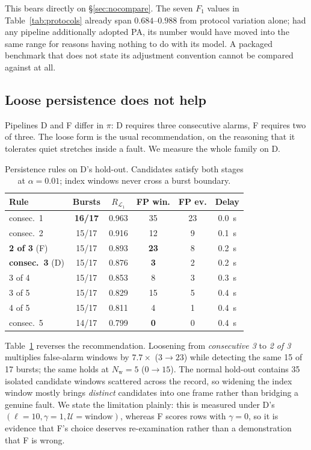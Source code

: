 \documentclass{article}
\begin{document}
This bears directly on \S\ref{sec:nocompare}. The seven $F_1$ values in
Table~\ref{tab:protocols} already span $0.684$--$0.988$ from protocol variation
alone; had any pipeline additionally adopted PA, its number would have moved
into the same range for reasons having nothing to do with its model. A
packaged benchmark that does not state its adjustment convention cannot be
compared against at all.

\subsection{Loose persistence does not help}
\label{sec:mofn}

Pipelines D and F differ in $\pi$: D requires three consecutive alarms,
F requires two of three. The loose form is the usual recommendation, on the
reasoning that it tolerates quiet stretches inside a fault. We measure the
whole family on D.

\begin{table}[t]
\caption{Persistence rules on D's hold-out. Candidates satisfy both stages at
$\alpha=0.01$; index windows never cross a burst boundary.}
\label{tab:mofn}
\vskip 0.1in
\centering\small
\setlength{\tabcolsep}{4pt}
\begin{tabular}{@{}lccccc@{}}
\toprule
Rule & Bursts & $R_{\mathcal{L}_1}$ & FP win. & FP ev. & Delay \\
\midrule
consec.\ 1 & \textbf{16/17} & 0.963 & 35 & 23 & \SI{0.0}{\second} \\
consec.\ 2 & 15/17 & 0.916 & 12 & 9 & \SI{0.1}{\second} \\
\textbf{2 of 3} \small(F) & 15/17 & 0.893 & \textbf{23} & 8 & \SI{0.2}{\second} \\
\textbf{consec.\ 3} \small(D) & 15/17 & 0.876 & \textbf{3} & 2 & \SI{0.2}{\second} \\
3 of 4 & 15/17 & 0.853 & 8 & 3 & \SI{0.3}{\second} \\
3 of 5 & 15/17 & 0.829 & 15 & 5 & \SI{0.4}{\second} \\
4 of 5 & 15/17 & 0.811 & 4 & 1 & \SI{0.4}{\second} \\
consec.\ 5 & 14/17 & 0.799 & \textbf{0} & 0 & \SI{0.4}{\second} \\
\bottomrule
\end{tabular}
\end{table}

Table~\ref{tab:mofn} reverses the recommendation. Loosening from
\emph{consecutive 3} to \emph{2 of 3} multiplies false-alarm windows by
$7.7\times$ ($3\to23$) while detecting the same 15 of 17 bursts; the same holds
at $N_{\mathrm w}=5$ ($0\to15$). The normal hold-out contains 35 isolated
candidate windows scattered across the record, so widening the index window
mostly brings \emph{distinct} candidates into one frame rather than bridging a
genuine fault. We state the limitation plainly: this is measured under D's
$(\ell=10,\gamma=1,\mathcal{U}=\text{window})$, whereas F scores rows with
$\gamma=0$, so it is evidence that F's choice deserves re-examination rather
than a demonstration that F is wrong.
\end{document}
